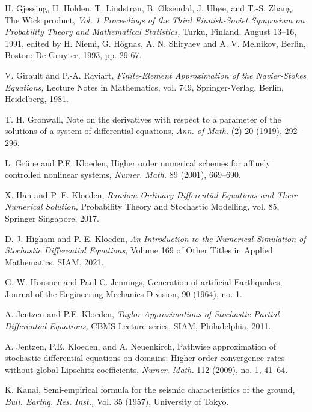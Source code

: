 \documentclass[reqno,12pt]{amsart}
\theoremstyle{plain} %
\theoremstyle{definition} %
\begin{document}
\begin{thebibliography}{25}
     H. Gjessing, H. Holden, T. Lindstr{\o}n, B. {\O}ksendal, J. Ub{\o}e, and T.-S. Zhang, The Wick product, \emph{Vol. 1 Proceedings of the Third Finnish-Soviet Symposium on Probability Theory and Mathematical Statistics,} Turku, Finland, August 13--16, 1991, edited by H. Niemi, G. H\"ognas, A. N. Shiryaev and A. V. Melnikov, Berlin, Boston: De Gruyter, 1993, pp. 29-67.

     V. Girault and P.-A. Raviart, \emph{Finite-Element Approximation of the Navier-Stokes Equations,} Lecture Notes in Mathematics, vol. 749, Springer-Verlag, Berlin, Heidelberg, 1981.

     T. H. Gronwall, Note on the derivatives with respect to a parameter of the solutions of a system of differential equations, \emph{Ann. of Math.} (2) 20 (1919), 292--296.

     L. Gr\"une and P.E. Kloeden, Higher order numerical schemes for affinely controlled nonlinear systems, \emph{Numer. Math.} 89 (2001), 669--690.

     X. Han and P. E. Kloeden, \emph{Random Ordinary Differential Equations and Their Numerical Solution,} Probability Theory and Stochastic Modelling, vol. 85, Springer Singapore, 2017.

     D. J. Higham and P. E. Kloeden, \emph{An Introduction to the Numerical Simulation of Stochastic Differential Equations,} Volume 169 of Other Titles in Applied Mathematics, SIAM, 2021.

     G. W. Housner and Paul C. Jennings, Generation of artificial Earthquakes, Journal of the Engineering Mechanics Division, 90 (1964), no. 1.

     A. Jentzen and P.E. Kloeden, \emph{Taylor Approximations of Stochastic Partial Differential Equations,} CBMS Lecture series, SIAM, Philadelphia, 2011.

     A. Jentzen, P.E. Kloeden, and A. Neuenkirch, Pathwise approximation of stochastic differential equations on domains: Higher order convergence rates without global Lipschitz coefficients, \emph{Numer. Math.} 112 (2009), no. 1, 41--64.

     K. Kanai, Semi-empirical formula for the seismic characteristics of the ground, \emph{Bull. Earthq. Res. Inst.,} Vol. 35 (1957), University of Tokyo.


\end{thebibliography}
\end{document}
